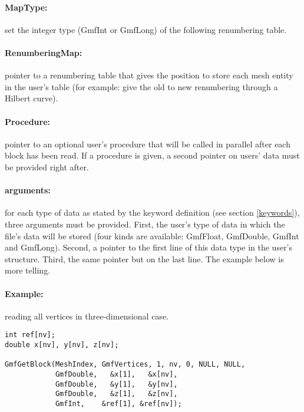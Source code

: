 \documentclass[a4paper,12pt]{article}
\begin{document}
\paragraph{MapType:} set the integer type (GmfInt or GmfLong) of the following renumbering table.

\paragraph{RenumberingMap:} pointer to a renumbering table that gives the position to store each mesh entity in the user's table (for example: give the old to new renumbering through a Hilbert curve).

\paragraph{Procedure:} pointer to an optional user's procedure that will be called in  parallel after each block has been read. If a procedure is given, a second pointer on users' data must be provided right after.

\paragraph{arguments:} for each type of data as stated by the keyword definition (see section \ref{keywords}), three arguments must be provided. First, the user's type of data in which the file's data will be stored (four kinds are available: GmfFloat, GmfDouble, GmfInt and GmfLong). Second, a pointer to the first line of this data type in the user's structure. Third, the same pointer but on the last line. The example below is more telling.

\clearpage
\paragraph{Example:} reading all vertices in three-dimensional case.

\begin{tt}
\begin{verbatim}
int ref[nv];
double x[nv], y[nv], z[nv];

GmfGetBlock(MeshIndex, GmfVertices, 1, nv, 0, NULL, NULL,
            GmfDouble,   &x[1],   &x[nv],
            GmfDouble,   &y[1],   &y[nv],
            GmfDouble,   &z[1],   &z[nv],
            GmfInt,    &ref[1], &ref[nv]);
\end{verbatim}
\end{tt}
\normalfont
\end{document}
